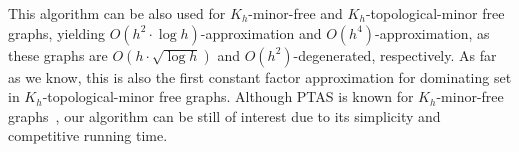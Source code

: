This algorithm can be also used for $K_h$-minor-free and $K_h$-topological-minor free graphs, yielding $O(h^2\cdot \log h)$-approximation and $O(h^4)$-approximation, as these graphs are $O(h \cdot \sqrt{\log h})$ and $O(h^2)$-degenerated, respectively. As far as we know, this is also the first constant factor approximation for dominating set in $K_h$-topological-minor free graphs. Although PTAS is known for $K_h$-minor-free graphs~\cite{Grohe03}, our algorithm can be still of interest due to its simplicity and competitive running time.
